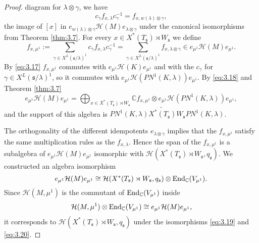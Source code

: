 \documentclass[11pt]{amsart}
\theoremstyle{definition}
\begin{document}
\begin{proof}
diagram for $\lambda \otimes \gamma$, we have
\begin{equation} 
c_\gamma f_{x,\lambda} c_\gamma^{-1} = f_{x,w(\lambda) \otimes \gamma},
\end{equation}
the image of $[x]$ in $e_{w(\lambda) \otimes \gamma} {{\mathcal H}} (M) e_{\lambda \otimes \gamma}$
under the canonical isomorphisms from Theorem \ref{thm:3.7}. For every
$x \in X^* (T_{{\mathfrak s}}) \rtimes W_{{\mathfrak s}}$ we define
\begin{equation}\label{eq:3.62}
f_{x,\mu^1} := \sum_{\gamma \in X^L ({{\mathfrak s}} / \lambda)^1} c_\gamma f_{x,\lambda} c_\gamma^{-1} 
= \sum_{\gamma \in X^L ({{\mathfrak s}} / \lambda)^1} f_{x,\lambda \otimes \gamma}
\in e_{\mu^1} {{\mathcal H}} (M) e_{\mu^1} .
\end{equation}
By \eqref{eq:3.17} $f_{x,\mu^1}$ commutes with $e_{\mu^1} {{\mathcal H}} (K) e_{\mu^1}$ and
with the $c_\gamma$ for $\gamma \in X^L ({{\mathfrak s}} / \lambda)^1$, so it commutes with 
$e_{\mu^1} {{\mathcal H}} (PN^1 (K,\lambda)) e_{\mu^1}$. 
By \eqref{eq:3.18} and Theorem \ref{thm:3.7}
\[
e_{\mu^1} {{\mathcal H}} (M) e_{\mu^1} = \bigoplus\nolimits_{x \in X^* (T_{{\mathfrak s}}) \rtimes W_{{\mathfrak s}}}
{\mathbb C} f_{x,\mu^1} \otimes e_{\mu^1} {{\mathcal H}} (PN^1 (K,\lambda)) e_{\mu^1} ,
\]
and the support of this algebra is $PN^1 (K,\lambda) \widetilde{X^* (T_{{\mathfrak s}})} 
W_{{\mathfrak s}} PN^1 (K,\lambda)$.

The orthogonality of the different idempotents $e_{\lambda \otimes \gamma}$ implies 
that the $f_{x,\mu^1}$ satisfy the same multiplication rules as the $f_{x,\lambda}$. 
Hence the span of the $f_{x,\mu^1}$ is a subalgebra of $e_{\mu^1} {{\mathcal H}} (M) e_{\mu^1}$ 
isomorphic with ${{\mathcal H}} (X^* (T_{{\mathfrak s}}) \rtimes W_{{\mathfrak s}} ,q_{{\mathfrak s}})$. 
We constructed an algebra isomorphism
\begin{equation}\label{eq:3.19}
e_{\mu^1} {{\mathcal H}} (M) e_{\mu^1} \cong {{\mathcal H}} (X^* (T_{{\mathfrak s}}) \rtimes W_{{\mathfrak s}},q_{{\mathfrak s}})
\otimes {{\rm End}}_{\mathbb C} (V_{\mu^1}) .
\end{equation}
Since ${{\mathcal H}} (M,\mu^1)$ is the commutant of ${{\rm End}}_{\mathbb C} (V_{\mu^1})$ inside
\begin{equation}\label{eq:3.20}
{{\mathcal H}} (M,\mu^1) \otimes {{\rm End}}_{\mathbb C} (V_{\mu^1}) \cong 
e_{\mu^1} {{\mathcal H}} (M) e_{\mu^1} ,
\end{equation}
it corresponds to ${{\mathcal H}} (X^* (T_{{\mathfrak s}}) \rtimes W_{{\mathfrak s}} ,q_{{\mathfrak s}})$ under the isomorphisms 
\eqref{eq:3.19} and \eqref{eq:3.20}.


\end{proof}
\end{document}
